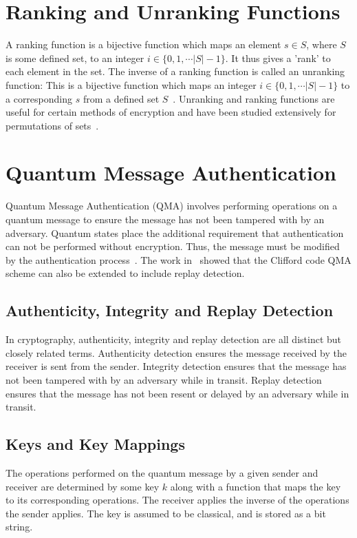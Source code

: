 \section{Ranking and Unranking Functions}
\label{subsec:unrankingFunction}
A ranking function is a bijective function which maps an element $s \in S$, where $S$ is some defined set, to an integer $i \in \{0, 1, \cdots \lvert S \rvert - 1\}$. It thus gives a 'rank' to each element in the set. The inverse of a ranking function is called an unranking function: This is a bijective function which maps an integer $i \in \{0, 1, \cdots \lvert S \rvert - 1\}$ to a corresponding $s$ from a defined set $S$~\cite{shimizu2014unranking}. Unranking and ranking functions are useful for certain methods of encryption and have been studied extensively for permutations of sets~\cite{arndt2010matters}.

\section{Quantum Message Authentication}
Quantum Message Authentication (QMA) involves performing operations on a quantum message to ensure the message has not been tampered with by an adversary. Quantum states place the additional requirement that authentication can not be performed without encryption. Thus, the message must be modified by the authentication process~\cite{barnum2002authentication}. The work in~\cite{barbeau2022authenticity} showed that the Clifford code QMA scheme can also be extended to include replay detection.
\subsection{Authenticity, Integrity and Replay Detection}
In cryptography, authenticity, integrity and replay detection are all distinct but closely related terms. Authenticity detection ensures the message received by the receiver is sent from the sender. Integrity detection ensures that the message has not been tampered with by an adversary while in transit. Replay detection ensures that the message has not been resent or delayed by an adversary while in transit.
\subsection{Keys and Key Mappings}
The operations performed on the quantum message by a given sender and receiver are determined by some key $k$ along with a function that maps the key to its corresponding operations. The receiver applies the inverse of the operations the sender applies. The key is assumed to be classical, and is stored as a bit string.
